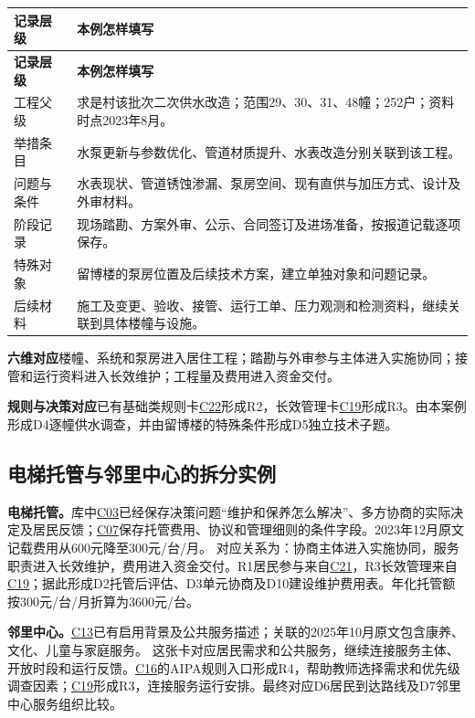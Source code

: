 \documentclass[UTF8,11pt,fontset=windows]{ctexart}
\newcommand{\field}[2]{\par\noindent\textbf{#1}\quad #2\par}
\begin{document}
\begin{longtable}{@{}L{35mm}L{124mm}@{}}
\toprule
\textbf{记录层级} & \textbf{本例怎样填写}\\
\midrule
\endfirsthead
\toprule
\textbf{记录层级} & \textbf{本例怎样填写}\\
\midrule
\endhead
工程父级 & 求是村该批次二次供水改造；范围29、30、31、48幢；252户；资料时点2023年8月。\\
举措条目 & 水泵更新与参数优化、管道材质提升、水表改造分别关联到该工程。\\
问题与条件 & 水表现状、管道锈蚀渗漏、泵房空间、现有直供与加压方式、设计及外审材料。\\
阶段记录 & 现场踏勘、方案外审、公示、合同签订及进场准备，按报道记载逐项保存。\\
特殊对象 & 留博楼的泵房位置及后续技术方案，建立单独对象和问题记录。\\
后续材料 & 施工及变更、验收、接管、运行工单、压力观测和检测资料，继续关联到具体楼幢与设施。\\
\bottomrule
\end{longtable}

\field{六维对应}{楼幢、系统和泵房进入居住工程；踏勘与外审参与主体进入实施协同；接管和运行资料进入长效维护；工程量及费用进入资金交付。}
\field{规则与决策对应}{已有基础类规则卡\hyperlink{EXP-e1688c4c-a449-48d4-9d16-38fea3ca845e}{C22}形成R2，长效管理卡\hyperlink{EXP-6baff473-93ed-4160-9a93-a0abf3c7b092}{C19}形成R3。由本案例形成D4逐幢供水调查，并由留博楼的特殊条件形成D5独立技术子题。}

\subsection{电梯托管与邻里中心的拆分实例}

\textbf{电梯托管。}库中\hyperlink{EXP-1f50f306-64e5-4335-be56-5c89531c00f2}{C03}已经保存决策问题“维护和保养怎么解决”、多方协商的实际决定及居民反馈；\hyperlink{EXP-3092f687-50c6-452e-b1d1-5703c250c25e}{C07}保存托管费用、协议和管理细则的条件字段。2023年12月原文记载费用从600元降至300元/台/月。\cite{trust} 对应关系为：协商主体进入实施协同，服务职责进入长效维护，费用进入资金交付。R1居民参与来自\hyperlink{EXP-c48118fa-9af5-4f9a-a634-ae276701cc6a}{C21}，R3长效管理来自\hyperlink{EXP-6baff473-93ed-4160-9a93-a0abf3c7b092}{C19}；据此形成D2托管后评估、D3单元协商及D10建设维护费用表。年化托管额按300元/台/月折算为3600元/台。

\textbf{邻里中心。}\hyperlink{EXP-8ab942a8-bdac-4075-97da-46b09ee9aa41}{C13}已有启用背景及公共服务描述；关联的2025年10月原文包含康养、文化、儿童与家庭服务。\cite{neighbor} 这张卡对应居民需求和公共服务，继续连接服务主体、开放时段和运行反馈。\hyperlink{EXP-2c88cc20-e2d3-4a32-a176-e48d753a4712}{C16}的AIPA规则入口形成R4，帮助教师选择需求和优先级调查因素；\hyperlink{EXP-6baff473-93ed-4160-9a93-a0abf3c7b092}{C19}形成R3，连接服务运行安排。最终对应D6居民到达路线及D7邻里中心服务组织比较。
\end{document}
